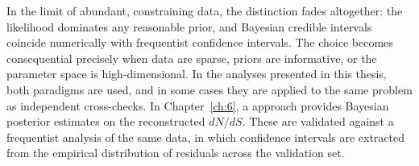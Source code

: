 In the limit of abundant, constraining data, the distinction fades altogether: the likelihood dominates any reasonable prior, and Bayesian credible intervals coincide numerically with frequentist confidence intervals.
The choice becomes consequential precisely when data are sparse, priors are informative, or the parameter space is high-dimensional.
In the analyses presented in this thesis, both paradigms are used, and in some cases they are applied to the same problem as independent cross-checks.
In Chapter~\ref{ch:6}, a \SBI approach provides Bayesian posterior estimates on the reconstructed $dN/dS$.
These are validated against a frequentist analysis of the same data, in which confidence intervals are extracted from the empirical distribution of residuals across the validation set.
